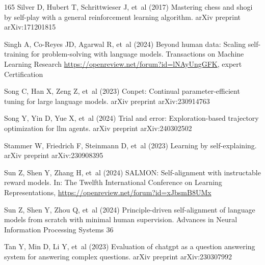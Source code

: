 \documentclass[sn-basic, Numbered]{sn-jnl}%
\theoremstyle{thmstyleone}%
\theoremstyle{thmstyletwo}%
\theoremstyle{thmstylethree}%
\begin{document}
\begin{thebibliography}{165}
Silver D, Hubert T, Schrittwieser J, et~al (2017) Mastering chess and shogi by self-play with a general reinforcement learning algorithm. arXiv preprint arXiv:171201815

Singh A, Co-Reyes JD, Agarwal R, et~al (2024) Beyond human data: Scaling self-training for problem-solving with language models. Transactions on Machine Learning Research \urlprefix\url{https://openreview.net/forum?id=lNAyUngGFK}, expert Certification

Song C, Han X, Zeng Z, et~al (2023) Conpet: Continual parameter-efficient tuning for large language models. arXiv preprint arXiv:230914763

Song Y, Yin D, Yue X, et~al (2024) Trial and error: Exploration-based trajectory optimization for llm agents. arXiv preprint arXiv:240302502

Stammer W, Friedrich F, Steinmann D, et~al (2023) Learning by self-explaining. arXiv preprint arXiv:230908395

Sun Z, Shen Y, Zhang H, et~al (2024{}) {SALMON}: Self-alignment with instructable reward models. In: The Twelfth International Conference on Learning Representations, \urlprefix\url{https://openreview.net/forum?id=xJbsmB8UMx}

Sun Z, Shen Y, Zhou Q, et~al (2024{}) Principle-driven self-alignment of language models from scratch with minimal human supervision. Advances in Neural Information Processing Systems 36

Tan Y, Min D, Li Y, et~al (2023) Evaluation of chatgpt as a question answering system for answering complex questions. arXiv preprint arXiv:230307992


\end{thebibliography}
\end{document}
